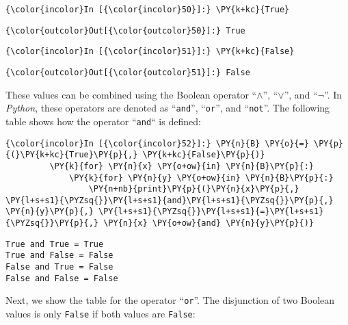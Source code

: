 \begin{Verbatim}[commandchars=\\\{\}]
{\color{incolor}In [{\color{incolor}50}]:} \PY{k+kc}{True}
\end{Verbatim}

\begin{Verbatim}[commandchars=\\\{\}]
{\color{outcolor}Out[{\color{outcolor}50}]:} True
\end{Verbatim}
            
\begin{Verbatim}[commandchars=\\\{\}]
{\color{incolor}In [{\color{incolor}51}]:} \PY{k+kc}{False}
\end{Verbatim}

\begin{Verbatim}[commandchars=\\\{\}]
{\color{outcolor}Out[{\color{outcolor}51}]:} False
\end{Verbatim}
            
    These values can be combined using the Boolean operator ``\(\wedge\)'',
``\(\vee\)'', and ``\(\neg\)''. In \textsl{Python}, these operators are denoted as
``\texttt{and}'', ``\texttt{or}'', and ``\texttt{not}''. The following table shows how the operator ``\texttt{and}`` is
defined:

\begin{Verbatim}[commandchars=\\\{\}]
{\color{incolor}In [{\color{incolor}52}]:} \PY{n}{B} \PY{o}{=} \PY{p}{(}\PY{k+kc}{True}\PY{p}{,} \PY{k+kc}{False}\PY{p}{)}
         \PY{k}{for} \PY{n}{x} \PY{o+ow}{in} \PY{n}{B}\PY{p}{:}
             \PY{k}{for} \PY{n}{y} \PY{o+ow}{in} \PY{n}{B}\PY{p}{:}
                 \PY{n+nb}{print}\PY{p}{(}\PY{n}{x}\PY{p}{,} \PY{l+s+s1}{\PYZsq{}}\PY{l+s+s1}{and}\PY{l+s+s1}{\PYZsq{}}\PY{p}{,} \PY{n}{y}\PY{p}{,} \PY{l+s+s1}{\PYZsq{}}\PY{l+s+s1}{=}\PY{l+s+s1}{\PYZsq{}}\PY{p}{,} \PY{n}{x} \PY{o+ow}{and} \PY{n}{y}\PY{p}{)}
\end{Verbatim}

\begin{Verbatim}[commandchars=\\\{\}]
True and True = True
True and False = False
False and True = False
False and False = False
\end{Verbatim}
Next, we show the table for the operator ``\texttt{or}''.
The disjunction of two Boolean values is only \texttt{False} if both values are
\texttt{False}:

